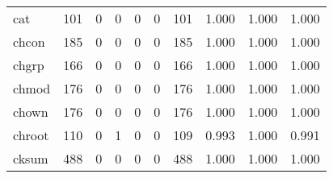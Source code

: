 \begin{longtable}{lp{1.3cm}p{1.3cm}p{1.3cm}p{1.3cm}p{1.3cm}p{1.3cm}p{1.3cm}p{1.3cm}p{1.3cm}}
cat       &                    101 &                                             0 &                                            0 &                                           0 &                                            0 &                                        101 &                                1.000 &                                  1.000 &                                1.000 \\
chcon     &                    185 &                                             0 &                                            0 &                                           0 &                                            0 &                                        185 &                                1.000 &                                  1.000 &                                1.000 \\
chgrp     &                    166 &                                             0 &                                            0 &                                           0 &                                            0 &                                        166 &                                1.000 &                                  1.000 &                                1.000 \\
chmod     &                    176 &                                             0 &                                            0 &                                           0 &                                            0 &                                        176 &                                1.000 &                                  1.000 &                                1.000 \\
chown     &                    176 &                                             0 &                                            0 &                                           0 &                                            0 &                                        176 &                                1.000 &                                  1.000 &                                1.000 \\
chroot    &                    110 &                                             0 &                                            1 &                                           0 &                                            0 &                                        109 &                                0.993 &                                  1.000 &                                0.991 \\
cksum     &                    488 &                                             0 &                                            0 &                                           0 &                                            0 &                                        488 &                                1.000 &                                  1.000 &                                1.000 \\

\end{longtable}
